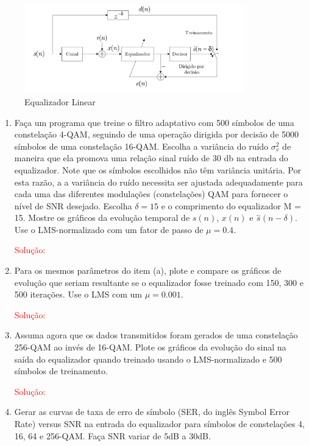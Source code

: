 \documentclass[a4paper,10pt]{article}
\begin{document}
\begin{enumerate}
				\begin{figure}[!ht]
					\centering
					\includegraphics[width=0.85\textwidth]{figs/equalizador_linear.png}
					\caption{Equalizador Linear}
				\end{figure}
			
				\begin{enumerate}
					
					\item Faça um programa que treine o ﬁltro adaptativo com 500 símbolos de uma constelação 4-QAM, seguindo de uma operação dirigida por decisão de 5000 símbolos de uma constelação 16-QAM. Escolha a variância do ruído $\sigma^{2}_{v}$ de maneira que ela promova uma relação sinal ruído de 30 db na entrada do equalizador. Note que os símbolos escolhidos não têm variância unitária. Por esta razão, a a variância do ruído necessita ser ajustada adequadamente para cada uma das diferentes modulações (constelações) QAM para fornecer o nível de SNR desejado. Escolha $\delta = 15$ e o comprimento do equalizador M = 15. Mostre os gráﬁcos da evolução temporal de $s(n)$, $x(n)$ e $\overset{\sim}{s}(n - \delta)$. Use o LMS-normalizado com um fator de passo de $\mu = 0.4$.
								
						\textcolor{red}{Solução:}

					\item Para os mesmos parâmetros do item (a), plote e compare os gráﬁcos de evolução que seriam resultante se o equalizador fosse treinado com 150, 300 e 500 iterações. Use o LMS com um
					$\mu = 0.001$.
					
						\textcolor{red}{Solução:}

					\item Assuma agora que os dados transmitidos foram gerados de uma constelação 256-QAM ao invés de 16-QAM. Plote os gráﬁcos da evolução do sinal na saída do equalizador quando treinado
					usando o LMS-normalizado e 500 símbolos de treinamento.					
					
						\textcolor{red}{Solução:}

					\item Gerar as curvas de taxa de erro de símbolo (SER, do inglês Symbol Error Rate) versus SNR na entrada do equalizador para símbolos de constelações 4, 16, 64 e 256-QAM. Faça SNR variar
					de 5dB a 30dB.
					

\end{enumerate}
\end{enumerate}
\end{document}
